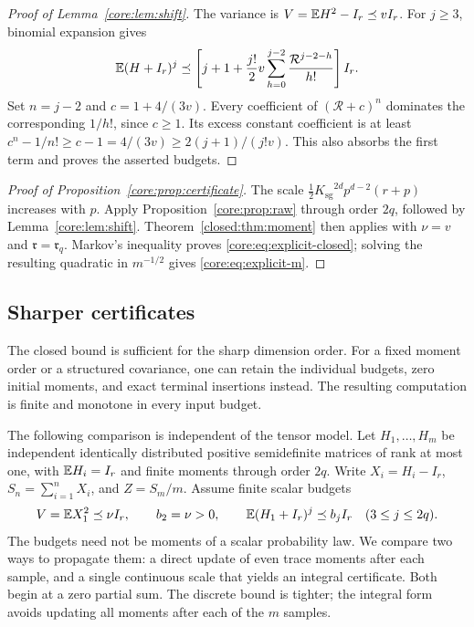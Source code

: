 \documentclass[11pt,a4paper]{article}
\theoremstyle{definition}\newtheorem{definition}[theorem]{Definition}
\theoremstyle{remark}\newtheorem{remark}[theorem]{Remark}
\numberwithin{equation}{section}
\newcommand{\Ksg}{{K_{\mathrm{sg}}}}\newcommand{\Cfour}{{C_4}}
\newcommand{\Rmom}{\mathfrak r}
\begin{document}
\begin{proof}[Proof of Lemma~\ref{core:lem:shift}]
The variance is $V=\mathbb E H^2-I_r\preceq vI_r$. For $j\ge3$, binomial
expansion gives
\[
 \mathbb E(H+I_r)^j\preceq
 \left[j+1+\frac{j!}{2}v
 \sum_{h=0}^{j-2}\frac{\mathcal R^{j-2-h}}{h!}\right]I_r.
\]
Set $n=j-2$ and $c=1+4/(3v)$. Every coefficient of $(\mathcal R+c)^n$
dominates the corresponding $1/h!$, since $c\ge1$.
Its excess constant coefficient is at least
$c^n-1/n!\ge c-1=4/(3v)\ge2(j+1)/(j!v)$.
This also absorbs the first term and proves the asserted budgets.
\end{proof}
\begin{proof}[Proof of Proposition~\ref{core:prop:certificate}]
\label{proof:certificate}
The scale $\tfrac12\Ksg^{2d}p^{d-2}(r+p)$ increases with $p$. Apply
Proposition~\ref{core:prop:raw} through order $2q$, followed by
Lemma~\ref{core:lem:shift}. Theorem~\ref{closed:thm:moment} then applies
with $\nu=v$ and $\Rmom=\Rmom_q$. Markov's inequality proves
\eqref{core:eq:explicit-closed}; solving the resulting quadratic in
$m^{-1/2}$ gives \eqref{core:eq:explicit-m}.
\end{proof}

\subsection{Sharper certificates}\label{sec:sharper}
The closed bound is sufficient for the sharp dimension order. For a fixed
moment order or a structured covariance, one can retain the individual
budgets, zero initial moments, and exact terminal insertions instead.
The resulting computation is finite and monotone in every input budget.

The following comparison is independent of the tensor model. Let
$H_1,\ldots,H_m$ be independent identically distributed positive
semidefinite matrices of rank at most one, with $\mathbb E H_i=I_r$ and finite
moments through order $2q$. Write $X_i=H_i-I_r$,
$S_n=\sum_{i=1}^nX_i$, and $Z=S_m/m$. Assume finite scalar budgets
\begin{equation}\label{core:eq:budgets}
 V=\mathbb E X_1^2\preceq\nu I_r,\qquad b_2=\nu>0,\qquad
 \mathbb E(H_1+I_r)^j\preceq b_jI_r\quad(3\le j\le2q).
\end{equation}
The budgets need not be moments of a scalar probability law.
We compare two ways to propagate them: a direct update of even trace
moments after each sample, and a single continuous scale that yields
an integral certificate. Both begin at a zero partial sum. The discrete
bound is tighter; the integral form avoids updating all moments after
each of the $m$ samples.
\end{document}
